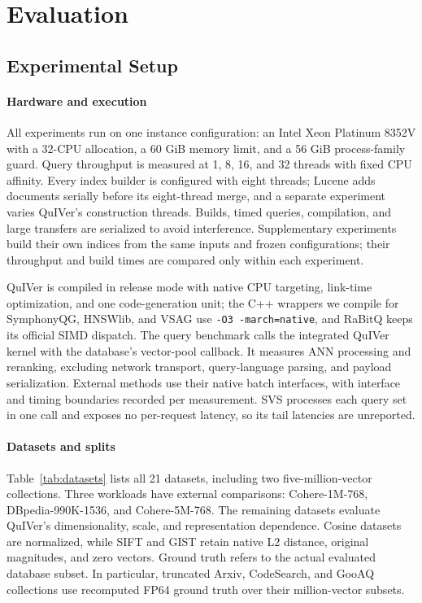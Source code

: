 \section{Evaluation}
\label{sec:evaluation}

\subsection{Experimental Setup}
\paragraph{Hardware and execution}
All experiments run on one instance configuration: an Intel Xeon Platinum 8352V with a 32-CPU allocation, a 60 GiB memory limit, and a 56 GiB process-family guard. Query throughput is measured at 1, 8, 16, and 32 threads with fixed CPU affinity. Every index builder is configured with eight threads; Lucene adds documents serially before its eight-thread merge, and a separate experiment varies QuIVer's construction threads. Builds, timed queries, compilation, and large transfers are serialized to avoid interference. Supplementary experiments build their own indices from the same inputs and frozen configurations; their throughput and build times are compared only within each experiment.

QuIVer is compiled in release mode with native CPU targeting, link-time optimization, and one code-generation unit; the C++ wrappers we compile for SymphonyQG, HNSWlib, and VSAG use \texttt{-O3 -march=native}, and RaBitQ keeps its official SIMD dispatch. The query benchmark calls the integrated QuIVer kernel with the database's vector-pool callback. It measures ANN processing and reranking, excluding network transport, query-language parsing, and payload serialization. External methods use their native batch interfaces, with interface and timing boundaries recorded per measurement. SVS processes each query set in one call and exposes no per-request latency, so its tail latencies are unreported.

\paragraph{Datasets and splits}
Table~\ref{tab:datasets} lists all 21 datasets, including two five-million-vector collections. Three workloads have external comparisons: Cohere-1M-768, DBpedia-990K-1536, and Cohere-5M-768. The remaining datasets evaluate QuIVer's dimensionality, scale, and representation dependence. Cosine datasets are normalized, while SIFT and GIST retain native L2 distance, original magnitudes, and zero vectors. Ground truth refers to the actual evaluated database subset. In particular, truncated Arxiv, CodeSearch, and GooAQ collections use recomputed FP64 ground truth over their million-vector subsets.

